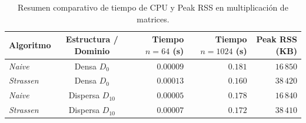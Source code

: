 \begin{table}[H]
\centering
\small
\begin{tabular}{|l|c|r|r|r|}
\hline
\textbf{Algoritmo} & \textbf{Estructura / Dominio} & \textbf{Tiempo $n=64$ (s)} & \textbf{Tiempo $n=1024$ (s)} & \textbf{Peak RSS (KB)} \\ \hline
\textit{Naive}    & Densa $D_0$     & $0.00009$ & $0.181$ & $16\,850$ \\ \hline
\textit{Strassen} & Densa $D_0$     & $0.00013$ & $0.160$ & $38\,420$ \\ \hline
\textit{Naive}    & Dispersa $D_{10}$ & $0.00005$ & $0.178$ & $16\,840$ \\ \hline
\textit{Strassen} & Dispersa $D_{10}$ & $0.00007$ & $0.172$ & $38\,410$ \\ \hline
\end{tabular}
\caption{Resumen comparativo de tiempo de CPU y Peak RSS en multiplicación de matrices.}
\label{tab:res_matrices}
\end{table}